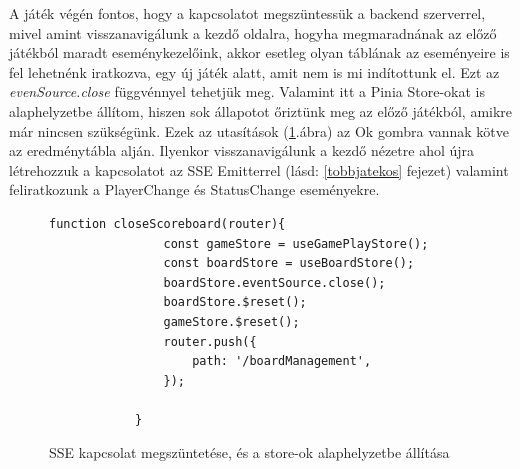 \documentclass[a4paper,twoside]{article}
\begin{document}
A játék végén fontos, hogy a kapcsolatot megszüntessük a backend szerverrel, mivel amint visszanavigálunk a kezdő oldalra, hogyha megmaradnának az előző játékból maradt eseménykezelőink, akkor esetleg olyan táblának az eseményeire is fel lehetnénk iratkozva, egy új játék alatt, amit nem is mi indítottunk el. Ezt az \textit{evenSource.close} függvénnyel tehetjük meg. Valamint itt a Pinia Store-okat is alaphelyzetbe állítom, hiszen sok állapotot őriztünk meg az előző játékból, amikre már nincsen szükségünk. Ezek az utasítások (\ref{reset}.ábra) az Ok gombra vannak kötve az eredménytábla alján. Ilyenkor visszanavigálunk a kezdő nézetre ahol újra létrehozzuk a kapcsolatot az SSE Emitterrel (lásd: \ref{tobbjatekos} fejezet) valamint feliratkozunk a PlayerChange és StatusChange eseményekre.  
\begin{figure}
	\caption{SSE kapcsolat megszüntetése, és a store-ok alaphelyzetbe állítása}
	\begin{minipage}{\textwidth}
		\begin{lstlisting}[style=javascriptStyle]
			function closeScoreboard(router){
				const gameStore = useGamePlayStore();
				const boardStore = useBoardStore();
				boardStore.eventSource.close();
				boardStore.$reset();
				gameStore.$reset();
				router.push({
					path: '/boardManagement',
				});
				
			}
		\end{lstlisting}
	\end{minipage}
	
	\label{reset}
\end{figure}
\FloatBarrier
\end{document}
